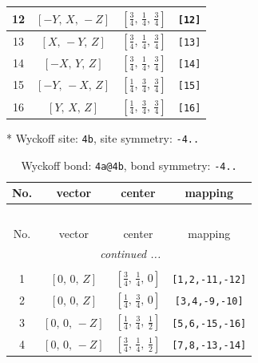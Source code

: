 \documentclass[fleqn,8pt]{jsarticle}
\begin{document}
\begin{longtable}{cccc}
12 & $\left[ - Y,\, X,\, - Z \right]$ & $\left[ \frac{3}{4},\, \frac{1}{4},\, \frac{3}{4} \right]$ & {\tt [12]} \\ \hline
13 & $\left[ X,\, - Y,\, Z \right]$ & $\left[ \frac{3}{4},\, \frac{1}{4},\, \frac{3}{4} \right]$ & {\tt [13]} \\ \hline
14 & $\left[ - X,\, Y,\, Z \right]$ & $\left[ \frac{3}{4},\, \frac{1}{4},\, \frac{3}{4} \right]$ & {\tt [14]} \\ \hline
15 & $\left[ - Y,\, - X,\, Z \right]$ & $\left[ \frac{1}{4},\, \frac{3}{4},\, \frac{3}{4} \right]$ & {\tt [15]} \\ \hline
16 & $\left[ Y,\, X,\, Z \right]$ & $\left[ \frac{1}{4},\, \frac{3}{4},\, \frac{3}{4} \right]$ & {\tt [16]} \\
\end{longtable}
* Wyckoff site: {\tt 4b}, site symmetry: {\tt -4..}
\renewcommand{\arraystretch}{1.2}
\begin{longtable}{cccc}
\caption{Wyckoff bond: {\tt 4a@4b}, bond symmetry: {\tt -4..}}
 \\
 \hline \hline
No. & vector & center & mapping \\ \hline \endfirsthead

\multicolumn{3}{l}{\tablename\ \thetable{}} \\
 \hline \hline
No. & vector & center & mapping \\ \hline \endhead

 \hline \hline
\multicolumn{3}{r}{\footnotesize\it continued ...} \\ \endfoot

 \hline \hline
\multicolumn{3}{r}{} \\ \endlastfoot

1 & $\left[ 0,\, 0,\, Z \right]$ & $\left[ \frac{3}{4},\, \frac{1}{4},\, 0 \right]$ & {\tt [1,2,-11,-12]} \\ \hline
2 & $\left[ 0,\, 0,\, Z \right]$ & $\left[ \frac{1}{4},\, \frac{3}{4},\, 0 \right]$ & {\tt [3,4,-9,-10]} \\ \hline
3 & $\left[ 0,\, 0,\, - Z \right]$ & $\left[ \frac{1}{4},\, \frac{3}{4},\, \frac{1}{2} \right]$ & {\tt [5,6,-15,-16]} \\ \hline
4 & $\left[ 0,\, 0,\, - Z \right]$ & $\left[ \frac{3}{4},\, \frac{1}{4},\, \frac{1}{2} \right]$ & {\tt [7,8,-13,-14]} \\
\end{longtable}
\renewcommand{\arraystretch}{1.2}
\end{document}

